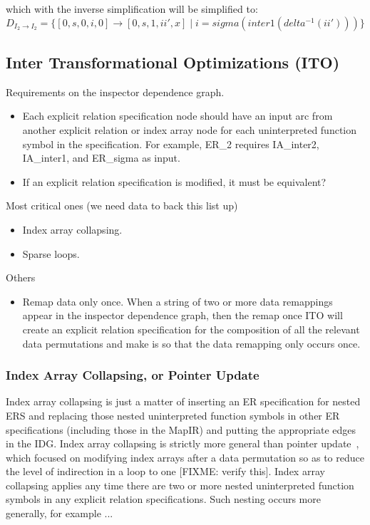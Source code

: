 \documentclass{article}
\begin{document}
which with the inverse simplification will be simplified to:
\[
	D_{I_2  \rightarrow I_2}  = \{   [ 0, s, 0, i, 0 ] \rightarrow [0, s,1, ii', x ] \; | \; i = sigma(inter1(delta^{-1}(ii'))) \} 
\]



\subsection{Inter Transformational Optimizations (ITO)}

Requirements on the inspector dependence graph.
\begin{itemize}
\item Each explicit relation specification node should have an input arc from another explicit relation or index array node for each uninterpreted function symbol in the specification.  For example, ER\_2 requires IA\_inter2, IA\_inter1, and ER\_sigma as input.
\item If an explicit relation specification is modified, it must be equivalent?
\end{itemize}

Most critical ones (we need data to back this list up)
\begin{itemize}
\item Index array collapsing.
\item Sparse loops.
\end{itemize}

Others
\begin{itemize}
\item Remap data only once.  When a string of two or more data remappings appear in the inspector dependence graph, then the remap once ITO will create an explicit relation specification for the composition of all the relevant data permutations and make is so that the data remapping only occurs once.
\end{itemize}

\subsubsection{Index Array Collapsing, or Pointer Update}


Index array collapsing is just a matter of inserting an ER specification for nested ERS and replacing those nested uninterpreted function symbols in other ER specifications (including those in the MapIR) and putting the appropriate edges in the IDG.  Index array collapsing is strictly more general than pointer update~\cite{DingKen99}, which focused on modifying index arrays after a data permutation so as to reduce the level of indirection in a loop to one [FIXME: verify this].  Index array collapsing applies any time there are two or more nested uninterpreted function symbols in any explicit relation specifications.  Such nesting occurs more generally, for example ...
\end{document}
